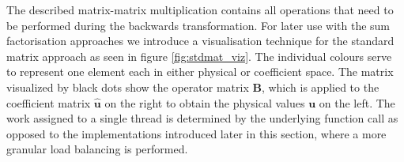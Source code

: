 The described matrix-matrix multiplication 
contains all operations that need to be performed during the backwards transformation.
For later use with the sum factorisation approaches we introduce a visualisation technique for the standard matrix approach as seen in figure \ref{fig:stdmat_viz}.
The individual colours serve to represent one element each in either physical or coefficient space.
The matrix visualized by black dots show the operator matrix $\mathbf{B}$, which is applied to the coefficient matrix $\mathbf{\hat{u}}$ on the right to obtain the physical values $\mathbf{u}$ on the left. The work assigned to a single thread is determined by the underlying function call as opposed to the implementations introduced later in this section, where a more granular load balancing is performed.

\begin{figure}[h!]
\centering
{}
\end{figure}
